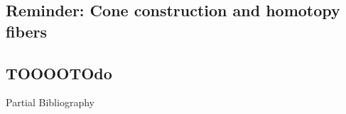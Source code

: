 \documentclass[beamer,10pt]{standalone}
\begin{document}





\subsection{Reminder: Cone construction and homotopy fibers}


\subsection{TOOOOTOdo}



\ifstandalone
\begin{frame}[t,allowframebreaks]{Partial Bibliography}
	\nocite{Miti2021}
	
	
\end{frame}
\fi
\end{document}

